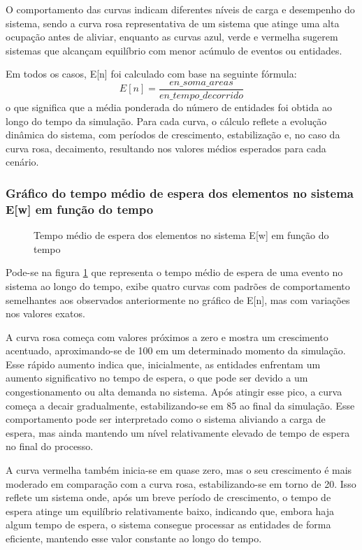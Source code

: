 O comportamento das curvas indicam diferentes níveis de carga e desempenho do sistema, sendo a curva rosa representativa de um sistema que atinge uma alta ocupação antes de aliviar, enquanto as curvas azul, verde e vermelha sugerem sistemas que alcançam equilíbrio com menor acúmulo de eventos ou entidades.

Em todos os casos, E[n] foi calculado com base na seguinte fórmula:
$$
    E[n]=\frac{en\_soma\_areas}{en\_tempo\_decorrido}
$$
o que significa que a média ponderada do número de entidades foi obtida ao longo do tempo da simulação. Para cada curva, o cálculo reflete a evolução dinâmica do sistema, com períodos de crescimento, estabilização e, no caso da curva rosa, decaimento, resultando nos valores médios esperados para cada cenário.
\subsubsection{Gráfico do tempo médio de espera dos elementos no sistema E[w] em função do tempo}
\begin{figure}[h!]
   \centering
   
   \caption{Tempo médio de espera dos elementos no sistema E[w] em função do tempo}
   \label{fig:eW}
\end{figure}

Pode-se na figura \ref{fig:eW} que representa o tempo médio de espera de uma evento no sistema ao longo do tempo, exibe quatro curvas com padrões de comportamento semelhantes aos observados anteriormente no gráfico de E[n], mas com variações nos valores exatos.

A curva rosa começa com valores próximos a zero e mostra um crescimento acentuado, aproximando-se de 100 em um determinado momento da simulação. Esse rápido aumento indica que, inicialmente, as entidades enfrentam um aumento significativo no tempo de espera, o que pode ser devido a um congestionamento ou alta demanda no sistema. Após atingir esse pico, a curva começa a decair gradualmente, estabilizando-se em 85 ao final da simulação. Esse comportamento pode ser interpretado como o sistema aliviando a carga de espera, mas ainda mantendo um nível relativamente elevado de tempo de espera no final do processo.

A curva vermelha também inicia-se em quase zero, mas o seu crescimento é mais moderado em comparação com a curva rosa, estabilizando-se em torno de 20. Isso reflete um sistema onde, após um breve período de crescimento, o tempo de espera atinge um equilíbrio relativamente baixo, indicando que, embora haja algum tempo de espera, o sistema consegue processar as entidades de forma eficiente, mantendo esse valor constante ao longo do tempo.

